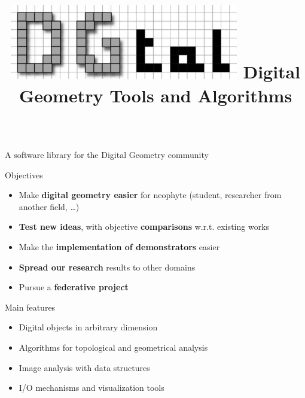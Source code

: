 \documentclass[noamsthm, pdftex, french]{beamer}
\title{\includegraphics[width=10cm]{Logos/DGtalLogo} \hspace*{2cm} Digital Geometry Tools and Algorithms  }
\author{}
\institute{{\Large \url{http://libdgtal.org}}}
\date{}
\begin{document}
\begin{frame}
  \thispagestyle{empty}
  \maketitle
  
  
  \begin{columns}
  
    
    
    \begin{alertblock}{\centering A software library for the Digital Geometry community}
      \begin{block}{Objectives}
        \begin{itemize}
        \item Make {\bf \color{DGtaldarkred} digital geometry easier} for  neophyte (student, researcher from another field, \ldots)
        \item {\bf \color{DGtaldarkred} Test new ideas}, with  objective {\bf \color{DGtaldarkred} comparisons} w.r.t. existing works
        \item Make the {\bf \color{DGtaldarkred} implementation of demonstrators} easier
        \item {\bf \color{DGtaldarkred} Spread our research} results to other domains
        \item Pursue a {\bf \color{DGtaldarkred} federative project}
        \end{itemize}
        
      \end{block}
      
      
      \begin{block}{Main features}
        
        \begin{itemize}
        \item Digital objects in arbitrary dimension
        \item Algorithms for topological and geometrical analysis
        \item Image analysis with data structures
        \item I/O mechanisms and visualization tools
        \end{itemize}
        
      \end{block}
      
      
      

\end{alertblock}
\end{columns}
\end{frame}
\end{document}
